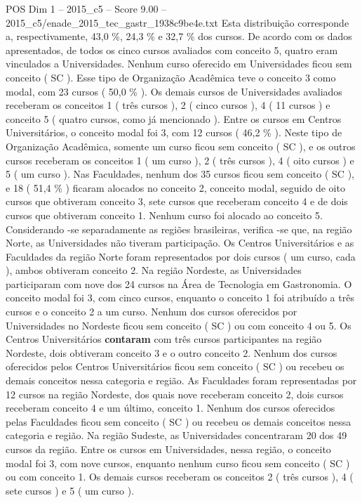 \begin{textsample}{POS Dim 1 – 2015\_c5 – Score 9.00 – 2015\_c5/enade\_2015\_tec\_gastr\_1938c9be4e.txt}
Esta distribuição corresponde a, respectivamente, 43,0 \%, 24,3 \% e 32,7 \% dos cursos.
De acordo com os dados apresentados, de todos os cinco cursos avaliados com conceito 5, quatro eram vinculados a Universidades.
Nenhum curso oferecido em Universidades ficou sem conceito ( SC ).
Esse tipo de Organização Acadêmica teve o conceito 3 como modal, com 23 cursos ( 50,0 \% ).
Os demais cursos de Universidades avaliados receberam os conceitos 1 ( três cursos ), 2 ( cinco cursos ), 4 ( 11 cursos ) e conceito 5 ( quatro cursos, como já mencionado ).
Entre os cursos em Centros Universitários, o conceito modal foi 3, com 12 cursos ( 46,2 \% ).
Neste tipo de Organização Acadêmica, somente um curso ficou sem conceito ( SC ), e os outros cursos receberam os conceitos 1 ( um curso ), 2 ( três cursos ), 4 ( oito cursos ) e 5 ( um curso ).
Nas Faculdades, nenhum dos 35 cursos ficou sem conceito ( SC ), e 18 ( 51,4 \% ) ficaram alocados no conceito 2, conceito modal, seguido de oito cursos que obtiveram conceito 3, sete cursos que receberam conceito 4 e de dois cursos que obtiveram conceito 1.
Nenhum curso foi alocado ao conceito 5.
Considerando -se separadamente as regiões brasileiras, verifica -se que, na região Norte, as Universidades não tiveram participação.
Os Centros Universitários e as Faculdades da região Norte foram representados por dois cursos ( um curso, cada ), ambos obtiveram conceito 2.
Na região Nordeste, as Universidades participaram com nove dos 24 cursos na Área de Tecnologia em Gastronomia.
O conceito modal foi 3, com cinco cursos, enquanto o conceito 1 foi atribuído a três cursos e o conceito 2 a um curso.
Nenhum dos cursos oferecidos por Universidades no Nordeste ficou sem conceito ( SC ) ou com conceito 4 ou 5.
Os Centros Universitários \textbf{contaram} com três cursos participantes na região Nordeste, dois obtiveram conceito 3 e o outro conceito 2.
Nenhum dos cursos oferecidos pelos Centros Universitários ficou sem conceito ( SC ) ou recebeu os demais conceitos nessa categoria e região.
As Faculdades foram representadas por 12 cursos na região Nordeste, dos quais nove receberam conceito 2, dois cursos receberam conceito 4 e um último, conceito 1.
Nenhum dos cursos oferecidos pelas Faculdades ficou sem conceito ( SC ) ou recebeu os demais conceitos nessa categoria e região.
Na região Sudeste, as Universidades concentraram 20 dos 49 cursos da região.
Entre os cursos em Universidades, nessa região, o conceito modal foi 3, com nove cursos, enquanto nenhum curso ficou sem conceito ( SC ) ou com conceito 1.
Os demais cursos receberam os conceitos 2 ( três cursos ), 4 ( sete cursos ) e 5 ( um curso ).

\end{textsample}
